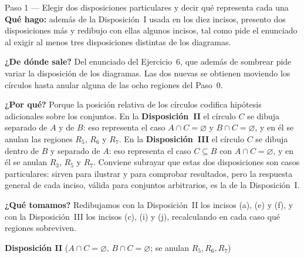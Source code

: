 \documentclass[11pt]{article}
\def\dA{(-1.35,0.65) circle (1.2)}
\def\dB{(0.15,0.65) circle (1.2)}
\def\dC{(1.95,-1.3) circle (0.95)}
\def\Unii{(-2.95,-2.55) rectangle (3.15,2.35)}
\newcommand{\dAout}{\clip \Unii \dA;}
\newcommand{\dBin}{\clip \dB;}
\newcommand{\dBout}{\clip \Unii \dB;}
\newcommand{\dCin}{\clip \dC;}
\newcommand{\dCout}{\clip \Unii \dC;}
\newcommand{\pintaII}{\fill[sombra] \Unii;}
\newcommand{\marcoII}{%
  \draw[thick] \Unii;
  \draw[thick] \dA; \draw[thick] \dB; \draw[thick] \dC;
  \node at (-2.15,1.45) {$A$};
  \node at (0.95,1.45) {$B$};
  \node at (1.95,-1.3) {$C$};
  \node at (-2.65,2.05) {$U$};
}
\begin{document}
\begin{paso}{Paso 1 --- Elegir dos disposiciones particulares y decir qué representa cada una}
\textbf{Qué hago:} además de la Disposición~I usada en los diez incisos, presento dos
disposiciones más y redibujo con ellas algunos incisos, tal como pide el enunciado al exigir al
menos tres disposiciones distintas de los diagramas.

\textbf{¿De dónde sale?} Del enunciado del Ejercicio~6, que además de sombrear pide variar la
disposición de los diagramas. Las dos nuevas se obtienen moviendo los círculos hasta anular
alguna de las ocho regiones del Paso~0.

\textbf{¿Por qué?} Porque la posición relativa de los círculos codifica hipótesis adicionales
sobre los conjuntos. En la \textbf{Disposición~II} el círculo $C$ se dibuja separado de $A$ y de
$B$: eso representa el caso $A\cap C=\varnothing$ y $B\cap C=\varnothing$, y en él se anulan las
regiones $R_{5}$, $R_{6}$ y $R_{7}$. En la \textbf{Disposición~III} el círculo $C$ se dibuja
dentro de $B$ y separado de $A$: eso representa el caso $C\subseteq B$ con $A\cap C=\varnothing$,
y en él se anulan $R_{3}$, $R_{5}$ y $R_{7}$. Conviene subrayar que estas dos disposiciones son
casos particulares: sirven para ilustrar y para comprobar resultados, pero la respuesta general
de cada inciso, válida para conjuntos arbitrarios, es la de la Disposición~I.

\textbf{¿Qué tomamos?} Redibujamos con la Disposición~II los incisos (a), (e) y (f), y con la
Disposición~III los incisos (c), (i) y (j), recalculando en cada caso qué regiones sobreviven.
\end{paso}

\begin{center}
\textbf{Disposición II} \quad ($A\cap C=\varnothing$, $B\cap C=\varnothing$; se anulan $R_{5},R_{6},R_{7}$)

\vspace{2mm}
\hspace{4mm}
\hspace{4mm}
\end{center}
\end{document}
